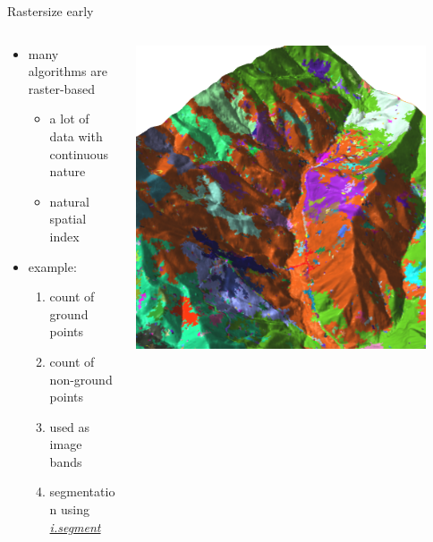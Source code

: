 \documentclass[xcolor={dvipsnames,usenames},beamer,aspectratio=43]{beamer}
\newcommand{\gmodule}[1]{\href{http://grass.osgeo.org/grass71/manuals/#1.html}{\emph{#1}}}
\begin{document}
\begin{frame}{Rastersize early}

\begin{columns}
\begin{column}{0.5\textwidth}

\begin{itemize}
  \item many algorithms are raster-based
  \begin{itemize}
    \item a lot of data with continuous nature
    \item natural spatial index
  \end{itemize}
  \item example:
  \begin{enumerate}
    \item count of ground points
    \item count of non-ground points
    \item used as image bands
    \item segmentation using \gmodule{i.segment}
  \end{enumerate}
\end{itemize}

\end{column}
\begin{column}{0.45\textwidth}

\begin{center}
  \includegraphics[width=0.9\textwidth]{grass/segment_on_counts}
\end{center}

\end{column}
\end{columns}

\end{frame}
\end{document}

